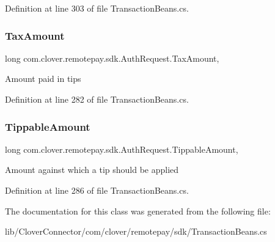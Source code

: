 Definition at line 303 of file Transaction\+Beans.\+cs.

\mbox{\label{classcom_1_1clover_1_1remotepay_1_1sdk_1_1_auth_request_ad23ebdcb14edcb4eb99b0572350905c6}} 
\subsubsection{\texorpdfstring{Tax\+Amount}{TaxAmount}}
{\footnotesize\ttfamily long com.\+clover.\+remotepay.\+sdk.\+Auth\+Request.\+Tax\+Amount\hspace{0.3cm}{\ttfamily [get]}, {\ttfamily [set]}}



Amount paid in tips 



Definition at line 282 of file Transaction\+Beans.\+cs.

\mbox{\label{classcom_1_1clover_1_1remotepay_1_1sdk_1_1_auth_request_a2f3e3450ac6bc785023926590bf4c468}} 
\subsubsection{\texorpdfstring{Tippable\+Amount}{TippableAmount}}
{\footnotesize\ttfamily long com.\+clover.\+remotepay.\+sdk.\+Auth\+Request.\+Tippable\+Amount\hspace{0.3cm}{\ttfamily [get]}, {\ttfamily [set]}}



Amount against which a tip should be applied 



Definition at line 286 of file Transaction\+Beans.\+cs.



The documentation for this class was generated from the following file\+:\begin{DoxyCompactItemize}
\item 
lib/\+Clover\+Connector/com/clover/remotepay/sdk/Transaction\+Beans.\+cs\end{DoxyCompactItemize}
